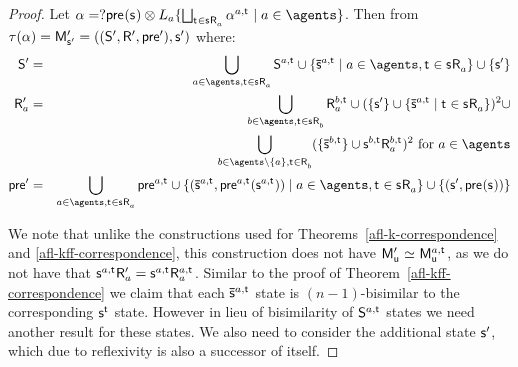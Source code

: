 \begin{proof}
Let $\alpha = \test{\aPrecondition(\aStateS)} \compose \learnsA \{\bigchoice_{\aStateT \in \aStateS \aAccessibility{\agentA}} \alpha^{\agentA,\aStateT} \mid \agentA \in \agents\}$.
Then from $\tau(\alpha) = \aPModelP{\aStateSP} =\aPModelTupleP{\aStateSP}$ where:
\begin{eqnarray*}
    \aStatesP &=& \bigcup_{\agentA \in \agents, \aStateT \in \aStateS \aAccessibility{\agentA}} \aStates[\agentA,\aStateT] \cup \{\aPStateS[\agentA,\aStateT] \mid \agentA \in \agents, \aStateT \in \aStateS \aAccessibility{\agentA}\} \cup \{\aStateSP\}\\
    \aAccessibilityP{\agentA} &=& \bigcup_{\agentB \in \agents, \aStateT \in \aStateS \aAccessibility{\agentB}} \aAccessibility[\agentB,\aStateT]{\agentA} \cup (\{\aStateSP\} \cup \{\aPStateS[\agentA,\aStateT] \mid \aStateT \in \aStateS \aAccessibility{\agentA}\})^2 \cup\\&&\quad\bigcup_{\agentB \in \agents \setminus \{\agentA\}, \aStateT \in \aAccessibility{\agentB}} (\{\aPStateS[\agentB,\aStateT]\} \cup \aStateS[\agentB,\aStateT] \aAccessibility[\agentB,\aStateT]{\agentA})^2 \text{ for } \agentA \in \agents\\
    \aPreconditionP &=& \bigcup_{\agentA \in \agents, \aStateT \in \aStateS \aAccessibility{\agentA}} \aPrecondition[\agentA,\aStateT] \cup \{(\aPStateS[\agentA,\aStateT], \aPrecondition[\agentA,\aStateT](\aStateS[\agentA,\aStateT])) \mid \agentA \in \agents, \aStateT \in \aStateS \aAccessibility{\agentA}\} \cup \{(\aStateSP, \aPrecondition(\aStateS))\}
\end{eqnarray*}

We note that unlike the constructions used for Theorems~\ref{afl-k-correspondence} and \ref{afl-kff-correspondence}, this construction does not have $\aPModelP{\aStateU} \bisimilar \aPModel[\agentA,\aStateT]{\aStateU}$, as we do not have that 
$\aStateS[\agentA,\aStateT] \aAccessibilityP{\agentA} = \aStateS[\agentA,\aStateT] \aAccessibility[\agentA,\aStateT]{\agentA}$.
Similar to the proof of Theorem~\ref{afl-kff-correspondence} we claim that each $\aPStateS[\agentA,\aStateT]$ state is $(n-1)$-bisimilar to the corresponding $\aStateS[\aStateT]$ state. 
However in lieu of bisimilarity of $\aStates[\agentA,\aStateT]$ states we need another result for these states.
We also need to consider the additional state ${\mathsf{{s}}^{\prime}}$, which due to reflexivity is also a successor of itself.


\end{proof}
